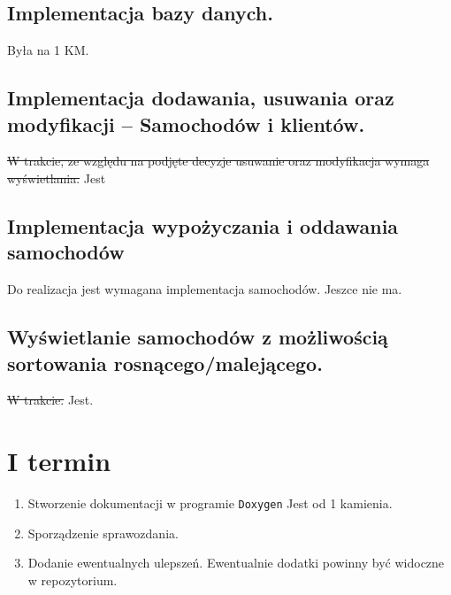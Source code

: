 \documentclass[11pt]{article}
\begin{document}
\subsection{Implementacja bazy danych.}
\label{sec:orgd73e259}
Była na 1 KM.
\subsection{Implementacja dodawania, usuwania oraz modyfikacji -- Samochodów i klientów.}
\label{sec:org8039ecb}
\sout{W trakcie, ze względu na podjęte decyzje usuwanie oraz modyfikacja wymaga wyświetlania.} Jest
\subsection{Implementacja wypożyczania i oddawania samochodów}
\label{sec:org2f1003d}
Do realizacja jest wymagana implementacja samochodów. Jeszce nie ma.
\subsection{Wyświetlanie samochodów z możliwością sortowania rosnącego/malejącego.}
\label{sec:org62bbe5e}
\sout{W trakcie.} Jest.
\section{I termin}
\label{sec:orgebebf2d}
\begin{enumerate}
\item Stworzenie dokumentacji w programie \texttt{Doxygen}
Jest od 1 kamienia.
\item Sporządzenie sprawozdania.

\item Dodanie ewentualnych ulepszeń.
Ewentualnie dodatki powinny być widoczne w repozytorium.
\end{enumerate}
\end{document}
